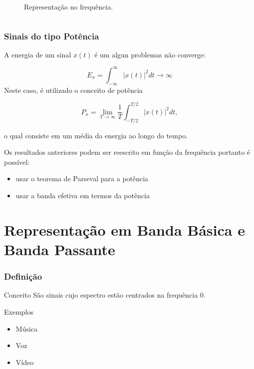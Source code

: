 \documentclass[10pt,hyperref={pdfpagemode=FullScreen},aspectratio=169]{beamer}
\begin{document}
\begin{frame}
\begin{columns}
\begin{column}{0.5\textwidth}
\begin{figure}[!t]
\begin{center}
          \caption{Representação no frequência.}
        \end{center}
      \end{figure}

    \end{column}
  \end{columns}

  

\end{frame}

\begin{frame}
  \frametitle{Sinais do tipo Potência}

  A energia de um sinal $x(t)$ é um algun problemas não converge:

$$
E_x = \int _{-\infty}^{\infty} |x(t)|^2 dt \rightarrow \infty
$$
Neste caso, é utilizado o conceito de potência

$$
P_x = \lim _{T \rightarrow \infty} \frac{1}{T}\int _{-T/2}^{T/2} |x(t)|^2 dt,
$$

o qual consiste em um média da energia ao longo do tempo.


Os resultados anteriores podem ser reescrito em função da frequência portanto é possível:
\begin{itemize}
  \item  usar o teorema de Parseval para a potência
  \item usar a banda efetiva em termos da potência
\end{itemize}

\end{frame}

\section{Representação em Banda Básica e Banda Passante}

\begin{frame}
  \frametitle{Definição}

  \begin{block}{Conceito}
    São sinais cujo espectro estão centrados na frequência 0.

  \end{block}

  \begin{block}{Exemplos}
    \begin{itemize}
      \item Música 
      \item Voz
      \item Vídeo
    
    \end{itemize}
  \end{block}
\end{frame}
\end{document}
